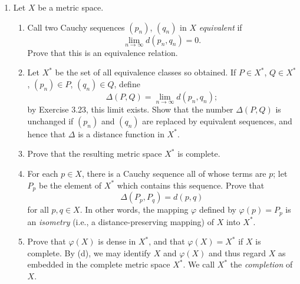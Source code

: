 \begin{enumerate}[label=\textbf{3.\arabic*.}, leftmargin=3.0em, itemsep=9pt,
                  topsep=8pt, labelsep=0.5em]
\item Let $X$ be a metric space.
\begin{enumerate}[label=(\alph*), leftmargin=2.2em, itemsep=3pt, topsep=3pt]
  \item Call two Cauchy sequences $(p_n)$, $(q_n)$ in $X$ \emph{equivalent} if
        \[ \lim_{n\to\infty} d(p_n,q_n) = 0. \]
        Prove that this is an equivalence relation.
  \item Let $X^*$ be the set of all equivalence classes so obtained. If
        $P \in X^*$, $Q \in X^*$, $(p_n) \in P$, $(q_n) \in Q$, define
        \[ \Delta(P,Q) = \lim_{n\to\infty} d(p_n,q_n); \]
        by Exercise 3.23, this limit exists. Show that the number
        $\Delta(P,Q)$ is unchanged if $(p_n)$ and $(q_n)$ are replaced by
        equivalent sequences, and hence that $\Delta$ is a distance function
        in $X^*$.
  \item Prove that the resulting metric space $X^*$ is complete.
  \item For each $p \in X$, there is a Cauchy sequence all of whose terms are
        $p$; let $P_p$ be the element of $X^*$ which contains this sequence.
        Prove that
        \[ \Delta(P_p,P_q) = d(p,q) \]
        for all $p,q \in X$. In other words, the mapping $\varphi$ defined by
        $\varphi(p) = P_p$ is an \emph{isometry} (i.e., a distance-preserving
        mapping) of $X$ into $X^*$.
  \item Prove that $\varphi(X)$ is dense in $X^*$, and that
        $\varphi(X) = X^*$ if $X$ is complete. By (d), we may identify $X$
        and $\varphi(X)$ and thus regard $X$ as embedded in the complete
        metric space $X^*$. We call $X^*$ the \emph{completion} of $X$.
\end{enumerate}


\end{enumerate}

